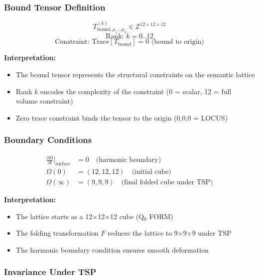 \documentclass[11pt, letterpaper]{article}
\begin{document}
\subsubsection{Bound Tensor Definition}

\begin{equation}
T_{\text{bound},\mu_1...\mu_k}^{(k)} \in \mathbb{Z}^{12 \times 12 \times 12}
\end{equation}
\begin{equation}
\text{Rank: } k = 0..12
\end{equation}
\begin{equation}
\text{Constraint: } \text{Trace}[T_{\text{bound}}] = 0 \text{ (bound to origin)}
\end{equation}

\textbf{Interpretation:}
\begin{itemize}
    \item The bound tensor represents the structural constraints on the semantic lattice
    \item Rank $k$ encodes the complexity of the constraint (0 = scalar, 12 = full volume constraint)
    \item Zero trace constraint binds the tensor to the origin (0,0,0 = LOCUS)
\end{itemize}

\subsubsection{Boundary Conditions}

\begin{align}
\frac{\partial \Omega}{\partial t}\bigg|_{\text{surface}} &= 0 \quad \text{(harmonic boundary)} \\
\Omega(0) &= (12, 12, 12) \quad \text{(initial cube)} \\
\Omega(\infty) &= (9, 9, 9) \quad \text{(final folded cube under TSP)}
\end{align}

\textbf{Interpretation:}
\begin{itemize}
    \item The lattice starts as a 12$\times$12$\times$12 cube (Q$_0$ FORM)
    \item The folding transformation $F$ reduces the lattice to 9$\times$9$\times$9 under TSP
    \item The harmonic boundary condition ensures smooth deformation
\end{itemize}

\subsubsection{Invariance Under TSP}
\end{document}
